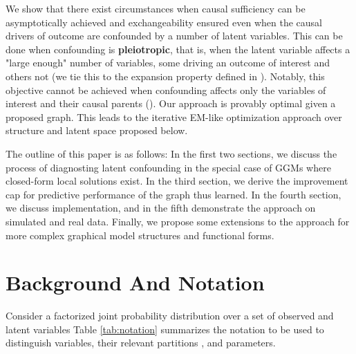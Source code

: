 \documentclass{article}
\begin{document}
We show that there exist circumstances when causal sufficiency can be asymptotically achieved and exchangeability ensured even when the causal drivers of outcome are confounded by a number of latent variables.  This can be done when confounding is \textbf{pleiotropic}, that is,  when the latent variable affects a "large enough" number of variables, some driving an outcome of interest and others not (we tie this to the expansion property defined in \cite{anandkumar_learning_2013}).  Notably, this objective cannot be achieved when confounding affects only the variables of interest and their causal parents (\cite{damour_multi-cause_2019}).  Our approach is provably optimal given a proposed graph. This leads to the iterative EM-like optimization approach over structure and latent space proposed below.

The outline of this paper is as follows: In the first two sections, we discuss the process of diagnosting latent confounding in the special case of GGMs where closed-form local solutions exist. In the third section, we derive the improvement cap for predictive performance of the graph thus learned. In the fourth section, we discuss implementation, and in the fifth demonstrate the approach on simulated and real data. Finally, we propose some extensions to the approach for more complex graphical model structures and functional forms. 

\section{Background And Notation}
\label{Background}

Consider a factorized joint probability distribution over a set of observed and latent variables Table \ref{tab:notation} summarizes the notation to be used to distinguish variables, their relevant partitions , and parameters. 
\end{document}
